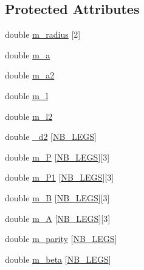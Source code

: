 \subsection*{Protected Attributes}
\begin{DoxyCompactItemize}
\item 
double \hyperlink{classstp_1_1_model_a55f0ee3549b8f7e582ae9958d69cc493}{m\+\_\+radius} \mbox{[}2\mbox{]}
\item 
double \hyperlink{classstp_1_1_model_a446d3fd455f0e44ec6a358b458ba85f2}{m\+\_\+a}
\item 
double \hyperlink{classstp_1_1_model_ad189b43e75b3b4a7a947e8142adce17c}{m\+\_\+a2}
\item 
double \hyperlink{classstp_1_1_model_a4093789451a0491487090daa1c4c9b85}{m\+\_\+l}
\item 
double \hyperlink{classstp_1_1_model_a9a16f1c28c96157d51bedbf67a1a7a81}{m\+\_\+l2}
\item 
double \hyperlink{classstp_1_1_model_ac031672ca5aae4c192c38b1103fdf2dd}{\+\_\+d2} \mbox{[}\hyperlink{model_8hpp_ae44092ed043cb4350e2df47fdee890b9}{N\+B\+\_\+\+L\+E\+GS}\mbox{]}
\item 
double \hyperlink{classstp_1_1_model_a773d6f9a6ee4f6dd580229e0dc3d741c}{m\+\_\+P} \mbox{[}\hyperlink{model_8hpp_ae44092ed043cb4350e2df47fdee890b9}{N\+B\+\_\+\+L\+E\+GS}\mbox{]}\mbox{[}3\mbox{]}
\item 
double \hyperlink{classstp_1_1_model_a82e25ba756ecbe2f929505ef4d97b317}{m\+\_\+\+P1} \mbox{[}\hyperlink{model_8hpp_ae44092ed043cb4350e2df47fdee890b9}{N\+B\+\_\+\+L\+E\+GS}\mbox{]}\mbox{[}3\mbox{]}
\item 
double \hyperlink{classstp_1_1_model_ad1f36bbb9a3f9aac7054b991bb02fe70}{m\+\_\+B} \mbox{[}\hyperlink{model_8hpp_ae44092ed043cb4350e2df47fdee890b9}{N\+B\+\_\+\+L\+E\+GS}\mbox{]}\mbox{[}3\mbox{]}
\item 
double \hyperlink{classstp_1_1_model_a4aaa7aee9ac9d9903d29d06cf15ed601}{m\+\_\+A} \mbox{[}\hyperlink{model_8hpp_ae44092ed043cb4350e2df47fdee890b9}{N\+B\+\_\+\+L\+E\+GS}\mbox{]}\mbox{[}3\mbox{]}
\item 
double \hyperlink{classstp_1_1_model_a3c26b01a6c5e533e25ec3de71c7f132c}{m\+\_\+parity} \mbox{[}\hyperlink{model_8hpp_ae44092ed043cb4350e2df47fdee890b9}{N\+B\+\_\+\+L\+E\+GS}\mbox{]}
\item 
double \hyperlink{classstp_1_1_model_a0dde329f8445840075590404c4f2c0de}{m\+\_\+beta} \mbox{[}\hyperlink{model_8hpp_ae44092ed043cb4350e2df47fdee890b9}{N\+B\+\_\+\+L\+E\+GS}\mbox{]}
\item 

\end{DoxyCompactItemize}

